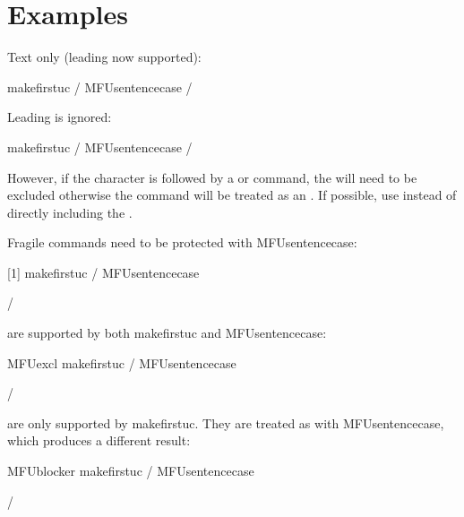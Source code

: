 \documentclass[titlepage=false,oneside,
 fontsize=12pt,captions=tableheading]{scrbook}
\begin{document}
\section{Examples}
\label{sec:sentencecaseex}

Text only (leading  now supported):
\begin{coderesult}
\gls{makefirstuc} /
\gls{MFUsentencecase}
\tcblower
{} /
\end{coderesult}

Leading  is ignored:
\begin{coderesult}
\gls{makefirstuc} /
\gls{MFUsentencecase}
\tcblower
{} /
\end{coderesult}
However, if the  character is followed by a
 or  command, the  will
need to be excluded otherwise the command will be treated as an
. If possible, use  instead of directly including the .

Fragile commands need to be protected with
\gls{MFUsentencecase}:
\begin{codebox}
[1]
\gls{makefirstuc} /
\gls{MFUsentencecase}
\end{codebox}
\begin{resultbox}
\newcommand{\alert}[1]{\textcolor{red}{\textbf{#1}}}
\makefirstuc{\alert{élite}} /
\MFUsentencecase{\protect\alert{élite}}
\end{resultbox}

 are supported by both \gls{makefirstuc} and
\gls{MFUsentencecase}:
\begin{codebox}
\gls{MFUexcl}
\gls{makefirstuc} /
\gls{MFUsentencecase}
\end{codebox}
\begin{resultbox}
\MFUexcl{\index}
 /
\end{resultbox}

 are only supported by \gls{makefirstuc}. 
They are treated as  with
\gls{MFUsentencecase}, which produces a different result:
\begin{codebox}
\gls{MFUblocker}
\gls{makefirstuc} /
\gls{MFUsentencecase}
\end{codebox}
\begin{resultbox}
\MFUblocker{\nameref}
 /
\end{resultbox}
\end{document}
